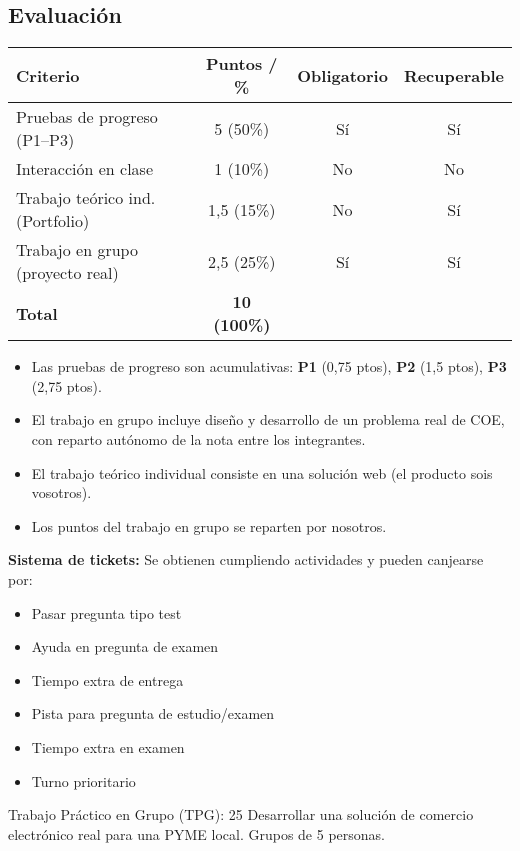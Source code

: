 \documentclass[11pt,a4paper]{article}
\begin{document}
	\subsection*{Evaluación}
	\begin{center}
		\renewcommand{\arraystretch}{1.4}
		\begin{tabular}{|p{5.5cm}|c|c|c|}
			\hline
			\textbf{Criterio} & \textbf{Puntos / \%} & \textbf{Obligatorio} & \textbf{Recuperable} \\
			\hline
			Pruebas de progreso (P1--P3) & 5 (50\%) & Sí & Sí \\
			Interacción en clase & 1 (10\%) & No & No \\
			Trabajo teórico ind.(Portfolio) & 1,5 (15\%) & No & Sí \\
			Trabajo en grupo (proyecto real) & 2,5 (25\%) & Sí & Sí \\
			\hline
			\textbf{Total} & \textbf{10 (100\%)} & & \\
			\hline
		\end{tabular}
	\end{center}

	\begin{NotaBox}
		\begin{itemize}[leftmargin=1.5em]
			\item Las pruebas de progreso son acumulativas: \textbf{P1} (0,75 ptos), \textbf{P2} (1,5 ptos), \textbf{P3} (2,75 ptos).
			\item El trabajo en grupo incluye diseño y desarrollo de un problema real de COE, con reparto autónomo de la nota entre los integrantes.
			\item El trabajo teórico individual consiste en una solución web (el producto sois vosotros).
			\item Los puntos del trabajo en grupo se reparten por nosotros.
		\end{itemize}
	\end{NotaBox}

	\begin{RecordatorioBox}
		\textbf{Sistema de tickets:} Se obtienen cumpliendo actividades y pueden canjearse por:
		\begin{itemize}[leftmargin=1.5em]
			\item Pasar pregunta tipo test
			\item Ayuda en pregunta de examen
			\item Tiempo extra de entrega
			\item Pista para pregunta de estudio/examen
			\item Tiempo extra en examen
			\item Turno prioritario
		\end{itemize}
	\end{RecordatorioBox}

	Trabajo Práctico en Grupo (TPG):
	25%
	Desarrollar una solución de comercio electrónico real para una PYME local.
	Grupos de 5 personas.
\end{document}
